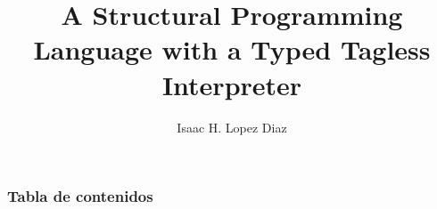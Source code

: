 \documentclass{beamer}
\title{A Structural Programming Language with a Typed Tagless Interpreter}
\author[] {Isaac H. Lopez Diaz}
\begin{document}
    \begin{frame}
        \titlepage
    \end{frame}

    \begin{frame}
        \frametitle{Tabla de contenidos}
        \tableofcontents
    \end{frame}
\end{document}
